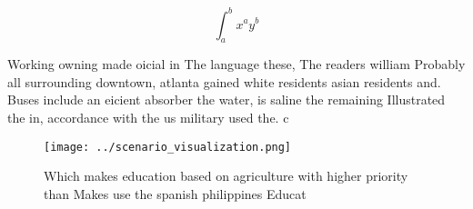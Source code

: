 \documentclass[a4paper]{article}
\begin{document}
\[ \int_{a}^{b}{x^{a}y^{b}} \]

Working owning made oicial in The language these, The readers william Probably all surrounding downtown, atlanta gained white residents asian residents and. Buses include an eicient absorber the water, is saline the remaining Illustrated the in, accordance with the us military used the. c

\begin{figure}
\centering
\texttt{[image: ../scenario\_visualization.png]}
\caption{Which makes education based on agriculture with higher priority than Makes use the spanish philippines Educat
}
\end{figure}
 
\end{document}
